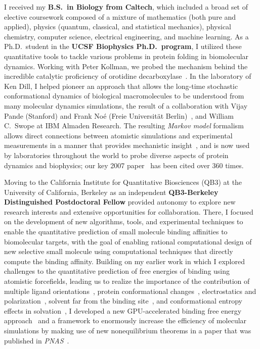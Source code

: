 \documentclass[10pt]{article}
\begin{document}
I received my {\bf B.S.~in Biology from Caltech}, which included a broad set of elective coursework composed of a mixture of mathematics (both pure and applied), physics (quantum, classical, and statistical mechanics), physical chemistry, computer science, electrical engineering, and machine learning.  
As a Ph.D.~student in the {\bf UCSF Biophysics Ph.D.~program}, I utilized these quantitative tools to tackle various problems in protein folding in biomolecular dynamics.
Working with Peter Kollman, we probed the mechanism behind the incredible catalytic proficiency of orotidine decarboxylase~\cite{lee-chong-chodera-kollman:2001:jacs:odcase}.
In the laboratory of Ken Dill, I helped pioneer an approach that allows the long-time stochastic conformational dynamics of biological macromolecules to be understood from many molecular dynamics simulations, the result of a collaboration with Vijay Pande (Stanford) and Frank No\'{e} (Freie Universit\"{a}t Berlin)~\cite{chodera:2006:mms:long-time-dynamics,chodera:jcp:2007,bacallado:2009:jcp:detailed-balance-constraint,temperature-dependent-markov-models,noe:pnas:2011:dynamical-fingerprints,noe:jcp:2011:msm-review}, and William C.~Swope at IBM Almaden Research.
The resulting \emph{Markov model} formalism allows direct connections between atomistic simulations and experimental measurements in a manner that provides mechanistic insight~\cite{chodera:2006:mms:long-time-dynamics,chodera:jcp:2007}, and is now used by laboratories throughout the world to probe diverse aspects of protein dynamics and biophysics; our key 2007 paper~\cite{chodera:jcp:2007} has been cited over 360 times.

Moving to the California Institute for Quantitative Biosciences (QB3) at the University of California, Berkeley as an independent {\bf QB3-Berkeley Distinguished Postdoctoral Fellow} provided autonomy to explore new research interests and extensive opportunities for collaboration.
There, I focused on the development of new algorithms, tools, and experimental techniques to enable the quantitative prediction of small molecule binding affinities to biomolecular targets, with the goal of enabling rational computational design of new selective small molecule using computational techniques that directly compute the binding affinity.
Building on my earlier work in which I explored challenges to the quantitative prediction of free energies of binding using atomistic forcefields, leading us to realize the importance of the contribution of multiple ligand orientations~\cite{mobley-chodera-dill:2006:jcp:orientation-restraints}, protein conformational changes~\cite{mobley-chodera-dill:2007:jctc:confine-and-release}, electrostatics and polarization~\cite{mobley:jpcb:2007:comparison-of-charge-models}, solvent far from the binding site~\cite{shirts-mobley-chodera-pande:2007:jpcb:dispersion-corrections}, and conformational entropy effects in solvation~\cite{mobley:jpcb:2008:implicit-hydration}, I developed a new GPU-accelerated binding free energy approach~\cite{wang:jcamd:2013:yank} and a framework to enormously increase the efficiency of molecular simulations by making use of new nonequilibrium theorems in a paper that was published in \emph{PNAS}~\cite{ncmc}.
\end{document}
